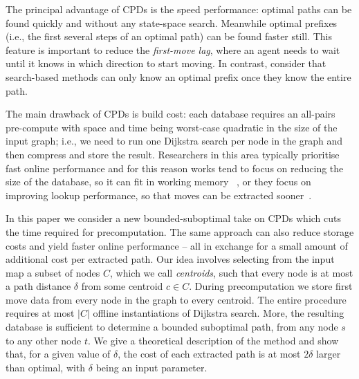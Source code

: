 
The principal advantage of CPDs is the speed performance: optimal paths can be found
quickly and without any state-space search.
Meanwhile optimal prefixes (i.e., the first several steps
of an optimal path) can be found faster still.
This feature is important to reduce the {\em first-move lag}, where
an agent needs to wait until it knows in which direction to start
moving.
In contrast, consider that search-based methods can only know an optimal 
prefix once they know the entire path.


The main drawback of CPDs is build cost:
each database requires an all-pairs pre-compute with space and time
being worst-case quadratic in the size of the input 
graph; i.e., we need to run one Dijkstra search per node in the 
graph and then compress and store the result.
Researchers in this area typically prioritise fast online performance
and for this reason works tend to focus on reducing the size of 
the database, so it can fit in working memory~
\cite{strasser-et-al-2014,DBLP:conf/aips/SalvettiBSG17,icaps19b},
or they focus on improving lookup performance, so that moves can be 
extracted sooner~\cite{DBLP:conf/aips/SalvettiBGHS18}.

In this paper we consider a new bounded-suboptimal take on CPDs which 
cuts the time required for precomputation. The same approach can 
also reduce storage costs and yield faster online performance -- 
all in exchange for a small amount of additional cost per extracted path.
Our idea involves selecting from the input map a subset of nodes $C$,
which we call {\em centroids}, such that every node is at most a 
path distance $\delta$ from some centroid $c \in C$. 
During precomputation we store first move data from every node 
in the graph to every centroid. The entire procedure requires at most
$|C|$ offline instantiations of Dijkstra search. More, the resulting
database is sufficient to determine a bounded suboptimal path,
from any node $s$ to any other node $t$.
We give a theoretical description of the method and show that,
for a given value of $\delta$, the cost of each extracted path is at 
most $2\delta$ larger than optimal, with $\delta$ being an input
parameter.  

